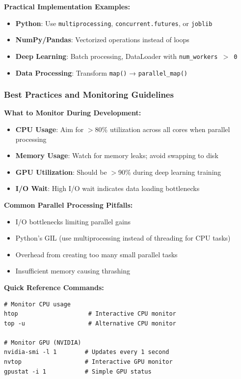\documentclass[11pt,a4paper]{article}
\begin{document}
\textbf{Practical Implementation Examples:}
\begin{itemize}
    \item \textbf{Python}: Use \texttt{multiprocessing}, \texttt{concurrent.futures}, or \texttt{joblib}
    \item \textbf{NumPy/Pandas}: Vectorized operations instead of loops
    \item \textbf{Deep Learning}: Batch processing, DataLoader with \texttt{num\_workers $>$ 0}
    \item \textbf{Data Processing}: Transform \texttt{map()} → \texttt{parallel\_map()}
\end{itemize}

\subsubsection{Best Practices and Monitoring Guidelines}

\textbf{What to Monitor During Development:}
\begin{itemize}
    \item \textbf{CPU Usage}: Aim for $>$80\% utilization across all cores when parallel processing
    \item \textbf{Memory Usage}: Watch for memory leaks; avoid swapping to disk
    \item \textbf{GPU Utilization}: Should be $>$90\% during deep learning training
    \item \textbf{I/O Wait}: High I/O wait indicates data loading bottlenecks
\end{itemize}

\textbf{Common Parallel Processing Pitfalls:}
\begin{itemize}
    \item I/O bottlenecks limiting parallel gains
    \item Python's GIL (use multiprocessing instead of threading for CPU tasks)
    \item Overhead from creating too many small parallel tasks
    \item Insufficient memory causing thrashing
\end{itemize}

\textbf{Quick Reference Commands:}

\begin{lstlisting}[style=bashstyle, caption=System Monitoring Commands]
# Monitor CPU usage
htop                    # Interactive CPU monitor
top -u                  # Alternative CPU monitor

# Monitor GPU (NVIDIA)
nvidia-smi -l 1        # Updates every 1 second
nvtop                  # Interactive GPU monitor
gpustat -i 1           # Simple GPU status
\end{lstlisting}
\end{document}
